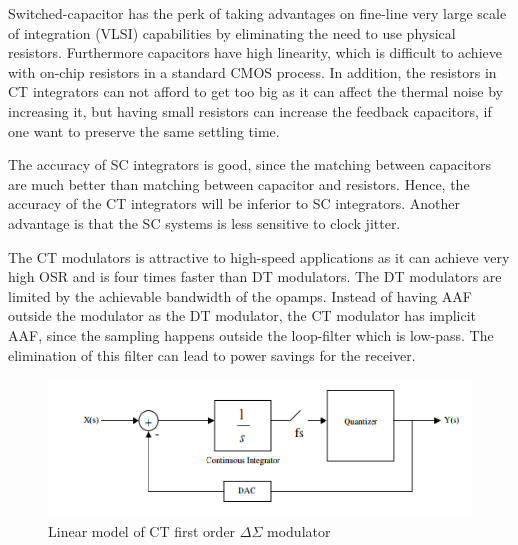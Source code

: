 Switched-capacitor has the perk of taking advantages on fine-line very large scale of integration (VLSI) capabilities by eliminating the need to use physical resistors. Furthermore capacitors have high linearity, which is difficult to achieve with on-chip resistors in a standard CMOS process. In addition, the resistors in CT integrators can not afford to get too big as it can affect the thermal noise by increasing it, but having small resistors can increase the feedback capacitors, if one want to preserve the same settling time. 

The accuracy of SC integrators is good, since the matching between capacitors are much better than matching between capacitor and resistors. Hence, the accuracy of the CT integrators will be inferior to SC integrators\cite[Ch.6.6]{Richard}. Another advantage is that the SC systems is less sensitive to clock jitter.

The CT modulators is attractive to high-speed applications as it can achieve very high OSR and is four times faster than DT modulators\cite{Richard}. The DT modulators are limited by the achievable bandwidth of the opamps. Instead of having AAF outside the modulator as the DT modulator, the CT modulator has implicit AAF, since the sampling happens outside the loop-filter which is low-pass. The elimination of this filter can lead to power savings for the receiver.

\begin{figure}[H]
\centering
\includegraphics[scale=0.9]{images/cont.png}
\caption{Linear model of CT first order $\Delta\Sigma$ modulator}
\label{fig:cont}
\end{figure}


